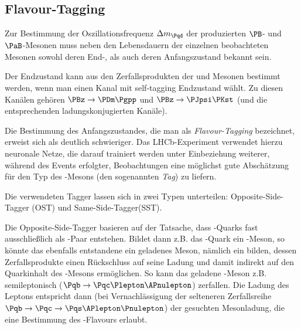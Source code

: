 


\begin{figure}
\end{figure}

\subsection{Flavour-Tagging}

Zur Bestimmung der Oszillationsfrequenz $\difference{m_{\Pqd}}$ der produzierten $\PB$- und $\PaB$-Mesonen muss neben den Lebensdauern der einzelnen beobachteten Mesonen sowohl deren End-, als auch deren Anfangszustand bekannt sein.

Der Endzustand kann aus den Zerfallsprodukten der \PBz und \PaBz Mesonen bestimmt werden, wenn man einen Kanal mit self-tagging Endzustand wählt.
Zu diesen Kanälen gehören $\PBz \to \PDm \Pgpp$ und $\PBz \to \PJpsi \PKst$ (und die entsprechenden ladungskonjugierten Kanäle).

Die Bestimmung des Anfangszustandes, die man als \emph{Flavour-Tagging} bezeichnet, erweist sich als deutlich schwieriger.
Das LHCb-Experiment verwendet hierzu neuronale Netze, die darauf trainiert werden unter Einbeziehung weiterer, während des Events erfolgter, Beobachtungen eine möglichst gute Abschätzung für den Typ des \PB-Mesons (den sogenannten \emph{Tag}) zu liefern.

Die verwendeten Tagger lassen sich in zwei Typen unterteilen: Opposite-Side-Tagger (OST) und Same-Side-Tagger(SST).

Die Opposite-Side-Tagger basieren auf der Tatsache, dass \Pqb-Quarks fast ausschließlich als \Pqb\Paqb-Paar entstehen. Bildet dann z.B. das \Pqb-Quark ein \PaB-Meson, so könnte das ebenfalls entstandene \Paqb ein geladenes Meson, nämlich ein \PBp bilden, dessen Zerfallsprodukte einen Rückschluss auf seine Ladung und damit indirekt auf den Quarkinhalt des \PaB-Mesons ermöglichen.
So kann das geladene \PB-Meson z.B. semileptonisch ($\Pqb \to \Pqc \Plepton \APnulepton$) zerfallen. Die Ladung des Leptons entspricht dann (bei Vernachlässigung der selteneren Zerfallsreihe $\Pqb \to \Pqc \to \Pqs \APlepton \Pnulepton$) der gesuchten Mesonladung, die eine Bestimmung des \PB-Flavours erlaubt.\cite{ost}

